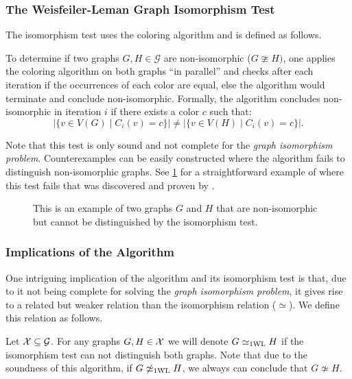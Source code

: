 \subsubsection{The Weisfeiler-Leman Graph Isomorphism Test}
The isomorphism test uses the \wl coloring algorithm and is defined as follows.

\begin{definition}
    To determine if two graphs $G, H \in \mathcal{G}$ are non-isomorphic ($G \ncong H)$, one applies the \wl coloring algorithm on both graphs ``in parallel'' and checks after each iteration if the occurrences of each color are equal, else the algorithm would terminate and conclude non-isomorphic. Formally, the algorithm concludes non-isomorphic in iteration $i$ if there exists a color $c$ such that: 
    \begin{equation*}
        |\{ v \in V(G) \mid C_i(v) = c\} | \neq |\{ v \in V(H) \mid C_i(v) = c\} |.
    \end{equation*}
\end{definition}

Note that this test is only sound and not complete for the \textit{graph isomorphism problem}. Counterexamples can be easily constructed where the algorithm fails to distinguish non-isomorphic graphs. See \cref{1-WL Counter Example} for a straightforward example of where this test fails that was discovered and proven by \cite{Cai1992}.
\begin{figure}[H]
    \centering
    
    \caption{This is an example of two graphs $G$ and $H$ that are non-isomorphic but cannot be distinguished by the \wl isomorphism test.}
    \label{1-WL Counter Example}
\end{figure}

\subsubsection{Implications of the \wl Algorithm}
One intriguing implication of the \wl algorithm and its isomorphism test is that, due to it not being complete for solving the \textit{graph isomorphism problem}, it gives rise to a related but weaker relation than the isomorphism relation ($\simeq$). We define this relation as follows.

\begin{definition}[\wl Relation]
    Let $\mathcal{X} \subseteq \mathcal{G}$. For any graphs $G,H \in \mathcal{X}$ we will denote $G \simeq_{\text{1WL}} H$ if the \wl isomorphism test can not distinguish both graphs. Note that due to the soundness of this algorithm, if $G \not\simeq_{\text{1WL}} H$, we always can conclude that $G \not\simeq H$.
\end{definition}

